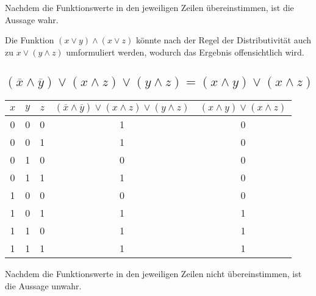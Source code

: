 \documentclass{article}
\begin{document}
\vspace{10px}

Nachdem die Funktionswerte in den jeweiligen Zeilen übereinstimmen, ist die Aussage wahr.

Die Funktion $(x \lor y) \land (x \lor z)$ könnte nach der Regel der Distributivität auch zu ${x \lor (y \land z)}$ umformuliert werden, wodurch das Ergebnis offensichtlich wird.

\subsection{$(\overline{x} \land \overline{y}) \lor (x \land z) \lor (y \land z) = (x \land y) \lor (x \land z)$}

\begin{center}
\begin{tabular}{c | c | c || c | c}
    $x$ & $y$ & $z$ & $(\overline{x} \land \overline{y}) \lor (x \land z) \lor (y \land z)$ & $(x \land y) \lor (x \land z)$\\
    \hline
    0 & 0 & 0 & 1 & 0\\
    0 & 0 & 1 & 1 & 0\\
    0 & 1 & 0 & 0 & 0\\
    0 & 1 & 1 & 1 & 0\\
    1 & 0 & 0 & 0 & 0\\
    1 & 0 & 1 & 1 & 1\\
    1 & 1 & 0 & 1 & 1\\
    1 & 1 & 1 & 1 & 1
\end{tabular}
\end{center}

\vspace{10px}

Nachdem die Funktionswerte in den jeweiligen Zeilen nicht übereinstimmen, ist die Aussage unwahr.
\end{document}
